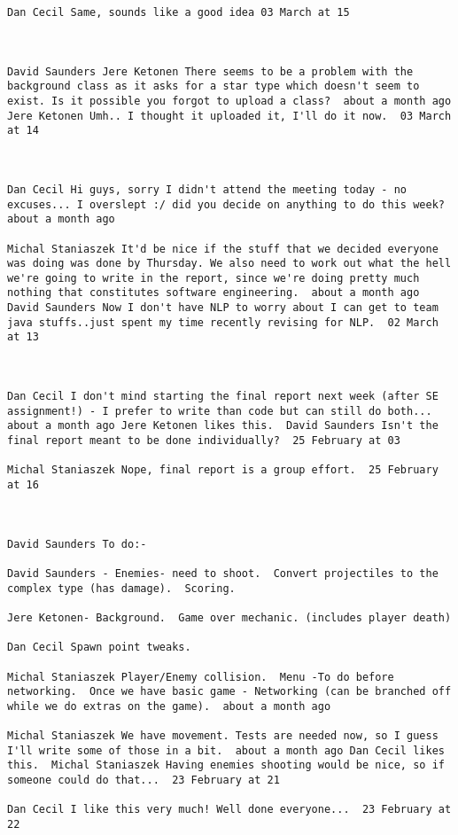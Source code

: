 \begin{verbatim}
Dan Cecil Same, sounds like a good idea 03 March at 15



David Saunders Jere Ketonen There seems to be a problem with the
background class as it asks for a star type which doesn't seem to
exist. Is it possible you forgot to upload a class?  about a month ago
Jere Ketonen Umh.. I thought it uploaded it, I'll do it now.  03 March
at 14



Dan Cecil Hi guys, sorry I didn't attend the meeting today - no
excuses... I overslept :/ did you decide on anything to do this week?
about a month ago

Michal Staniaszek It'd be nice if the stuff that we decided everyone
was doing was done by Thursday. We also need to work out what the hell
we're going to write in the report, since we're doing pretty much
nothing that constitutes software engineering.  about a month ago
David Saunders Now I don't have NLP to worry about I can get to team
java stuffs..just spent my time recently revising for NLP.  02 March
at 13



Dan Cecil I don't mind starting the final report next week (after SE
assignment!) - I prefer to write than code but can still do both...
about a month ago Jere Ketonen likes this.  David Saunders Isn't the
final report meant to be done individually?  25 February at 03

Michal Staniaszek Nope, final report is a group effort.  25 February
at 16



David Saunders To do:-

David Saunders - Enemies- need to shoot.  Convert projectiles to the
complex type (has damage).  Scoring.

Jere Ketonen- Background.  Game over mechanic. (includes player death)

Dan Cecil Spawn point tweaks.

Michal Staniaszek Player/Enemy collision.  Menu -To do before
networking.  Once we have basic game - Networking (can be branched off
while we do extras on the game).  about a month ago

Michal Staniaszek We have movement. Tests are needed now, so I guess
I'll write some of those in a bit.  about a month ago Dan Cecil likes
this.  Michal Staniaszek Having enemies shooting would be nice, so if
someone could do that...  23 February at 21

Dan Cecil I like this very much! Well done everyone...  23 February at
22




\end{verbatim}
